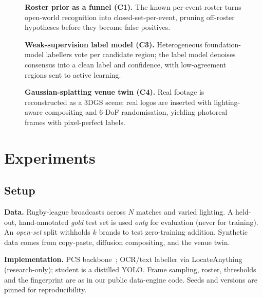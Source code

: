 \documentclass[conference]{IEEEtran}
\newcommand{\TODOnum}[1]{{\color{red}\textbf{#1}}}
\begin{document}
\begin{figure}[t]
\centering

\caption{\textbf{Roster prior as a funnel (C1).} The known per-event roster turns
open-world recognition into closed-set-per-event, pruning off-roster hypotheses
before they become false positives.}
\label{fig:funnel}
\end{figure}

\begin{figure}[t]
\centering

\caption{\textbf{Weak-supervision label model (C3).} Heterogeneous foundation-model
labellers vote per candidate region; the label model denoises consensus into a
clean label and confidence, with low-agreement regions sent to active learning.}
\label{fig:labelmodel}
\end{figure}

\begin{figure}[t]
\centering

\caption{\textbf{Gaussian-splatting venue twin (C4).} Real footage is reconstructed
as a 3DGS scene; real logos are inserted with lighting-aware compositing and 6-DoF
randomisation, yielding photoreal frames with pixel-perfect labels.}
\label{fig:twin}
\end{figure}

\section{Experiments}
\label{sec:exp}

\subsection{Setup}
\textbf{Data.} Rugby-league broadcasts across \TODOnum{$N$} matches and varied
lighting. A held-out, hand-annotated \emph{gold} test set is used \emph{only} for
evaluation (never for training). An \emph{open-set} split withholds
\TODOnum{$k$} brands to test zero-training addition. Synthetic data comes from
copy-paste, diffusion compositing, and the venue twin.

\textbf{Implementation.} PCS backbone~\cite{sam3}; OCR/text labeller via
LocateAnything~\cite{locateanything} (research-only); student is a distilled
YOLO. Frame sampling, roster, thresholds and the fingerprint are as in our public
data-engine code. Seeds and versions are pinned for reproducibility.
\end{document}
